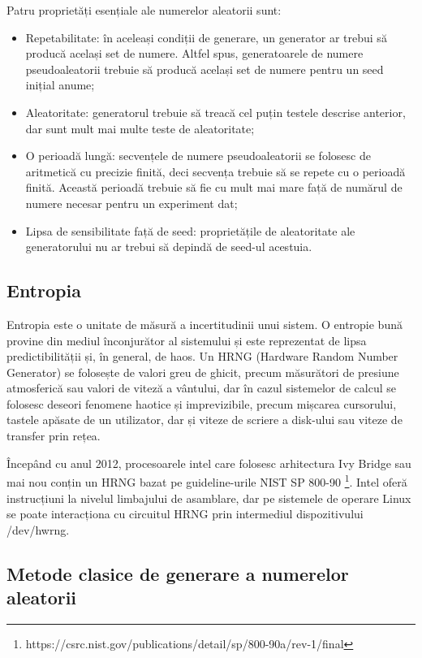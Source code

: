 Patru proprietăți esențiale ale numerelor aleatorii sunt:
\begin{itemize}
    \item Repetabilitate: în aceleași condiții de generare, un generator ar trebui să producă același set de numere. Altfel spus, generatoarele de numere pseudoaleatorii trebuie să producă același set de numere pentru un seed inițial anume;
    \item Aleatoritate: generatorul trebuie să treacă cel puțin testele descrise anterior, dar sunt mult mai multe teste de aleatoritate;
    \item O perioadă lungă: secvențele de numere pseudoaleatorii se folosesc de aritmetică cu precizie finită, deci secvența trebuie să se repete cu o perioadă finită. Această perioadă trebuie să fie cu mult mai mare față de numărul de numere necesar pentru un experiment dat;
    \item Lipsa de sensibilitate față de seed: proprietățile de aleatoritate ale generatorului nu ar trebui să depindă de seed-ul acestuia.
\end{itemize}

\subsection{Entropia}

Entropia este o unitate de măsură a incertitudinii unui sistem. O entropie bună provine din mediul înconjurător al sistemului și este reprezentat de lipsa predictibilității și, în general, de haos. Un HRNG (Hardware Random Number Generator) se folosește de valori greu de ghicit, precum măsurători de presiune atmosferică sau valori de viteză a vântului, dar în cazul sistemelor de calcul se folosesc deseori fenomene haotice și imprevizibile, precum mișcarea cursorului, tastele apăsate de un utilizator, dar și viteze de scriere a disk-ului sau viteze de transfer prin rețea. 

Începând cu anul 2012, procesoarele intel care folosesc arhitectura Ivy Bridge sau mai nou conțin un HRNG bazat pe guideline-urile NIST SP 800-90 \footnote{https://csrc.nist.gov/publications/detail/sp/800-90a/rev-1/final}. Intel oferă instrucțiuni la nivelul limbajului de asamblare, dar pe sistemele de operare Linux se poate interacționa cu circuitul HRNG prin intermediul dispozitivului /dev/hwrng. 


\subsection{Metode clasice de generare a numerelor aleatorii}

